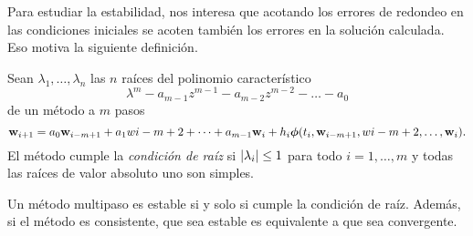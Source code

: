 Para estudiar la estabilidad,
nos interesa que acotando los errores de redondeo en las condiciones iniciales
se acoten también los errores en la solución calculada.
Eso motiva la siguiente definición.

\begin{definition}
    Sean $\lambda_1,\ldots,\lambda_n$ las $n$ raíces del
    polinomio característico
    \begin{equation*}
        \lambda^m - a_{m-1}z^{m-1} - a_{m-2}z^{m-2} - \dots - a_0
    \end{equation*}
    de un método a $m$ pasos
    \begin{equation}\label{eqn:multistep}
        \vb{w}{}_{i+1} = a_0\vb{w}{}_{i-m+1} + a_1w{i-m+2} + \dots + a_{m-1}\vb{w}{}_i
            + h_i\vb*{\phi}{}(t_i,\vb{w}{}_{i-m+1},w{i-m+2},\dots,\vb{w}{}_i).
    \end{equation}
    El método cumple la \emph{condición de raíz} si
    $\abs{\lambda_i} \le 1$ para todo $i = 1,\ldots, m$
    y todas las raíces de valor absoluto uno son simples.
\end{definition}

\begin{theorem}
    Un método multipaso es estable si y solo si cumple la condición de raíz.
    Además, si el método es consistente,
    que sea estable es equivalente a que sea convergente.
\end{theorem}

